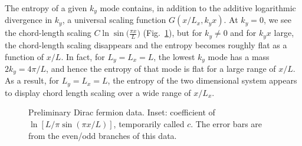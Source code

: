 \documentclass[prl,aps,twocolumn,floatfix,amsmath,amssymb,superscriptaddress,tightenlines]{revtex4}
\begin{document}
The entropy of a given $k_y$ mode contains, in addition to the additive logarithmic divergence in $k_y$, a universal scaling function $G(x/L_x,k_y x)$.  At $k_y=0$, we see the chord-length scaling $C \ln\sin\big( \frac{\pi x}{L} \big)$ (Fig.~\ref{fig:dirac}), but for $k_y \neq 0$ and for $k_y x$ large, the chord-length scaling disappears and the entropy becomes roughly flat as a function of $x/L$.  In fact, for $L_y=L_x=L$, the lowest $k_y$ mode has a mass $2 k_y=4\pi/L$, and hence the entropy of that mode is flat for a large range of $x/L$.  As a result, for $L_y=L_x=L$, the entropy of the two dimensional system appears to display chord length scaling over a wide range of $x/L_x$.

 \begin{figure}
   \begin{center}
   \end{center}
   \caption{Preliminary Dirac fermion data. Inset: coefficient of $\ln\left[ L/\pi \sin( \pi x/L ) \right]$, temporarily called $c$. The error bars are from the even/odd branches of this data.}
   \label{fig:dirac}
 \end{figure}
 
\end{document}
